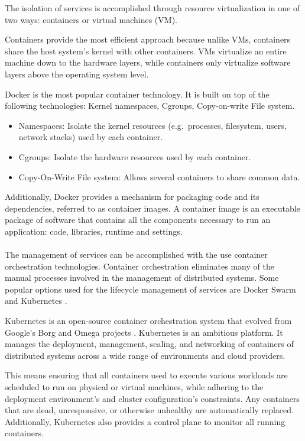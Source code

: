 The isolation of services is accomplished through resource virtualization in one of two ways: containers or virtual machines (VM).

Containers provide the most efficient approach because unlike VMs, containers share the host system’s kernel with other containers.
VMs virtualize an entire machine down to the hardware layers, while containers only virtualize software layers above the operating system level.

Docker \cite{docker} is the most popular container technology. It is built on top of the following technologies: Kernel namespaces, Cgroups, Copy-on-write File system.
\begin{itemize}
    \item Namespaces: Isolate the kernel resources (e.g.\ processes, filesystem, users, network stacks) used by each container.
    \item Cgroups: Isolate the hardware resources used by each container.
    \item Copy-On-Write File system: Allows several containers to share common data.
\end{itemize}

Additionally, Docker provides a mechanism for packaging code and its dependencies, referred to as container images.
A container image is an executable package of software that contains all the components necessary to run an application: code, libraries, runtime and settings.

\paragraph{}

The management of services can be accomplished with the use container orchestration technologies.
Container orchestration eliminates many of the manual processes involved in the management of distributed systems.
Some popular options used for the lifecycle management of services are Docker Swarm \cite{docker2016swarm} and Kubernetes \cite{kubernetes}.

Kubernetes \cite{kubernetes} is an open-source container orchestration system that evolved from Google's Borg and Omega projects \cite{burns2016borg}.
Kubernetes is an ambitious platform. It manages the deployment, management, scaling, and networking of containers of distributed systems across a wide range of environments
and cloud providers.

This means ensuring that all containers used to execute various workloads are scheduled to run on physical or virtual machines,
while adhering to the deployment environment's and cluster configuration's constraints.
Any containers that are dead, unresponsive, or otherwise unhealthy are automatically replaced.
Additionally, Kubernetes also provides a control plane to monitor all running containers.

